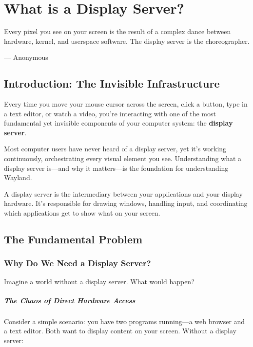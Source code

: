 \chapter{What is a Display Server?}
\label{ch:what-is-display-server}

\epigraph{Every pixel you see on your screen is the result of a complex dance between hardware, kernel, and userspace software. The display server is the choreographer.}{--- Anonymous}

\section{Introduction: The Invisible Infrastructure}

Every time you move your mouse cursor across the screen, click a button, type in a text editor, or watch a video, you're interacting with one of the most fundamental yet invisible components of your computer system: the \textbf{display server}.

Most computer users have never heard of a display server, yet it's working continuously, orchestrating every visual element you see. Understanding what a display server is—and why it matters—is the foundation for understanding Wayland.

\begin{importantbox}
A display server is the intermediary between your applications and your display hardware. It's responsible for drawing windows, handling input, and coordinating which applications get to show what on your screen.
\end{importantbox}

\section{The Fundamental Problem}

\subsection{Why Do We Need a Display Server?}

Imagine a world without a display server. What would happen?

\paragraph{The Chaos of Direct Hardware Access}

Consider a simple scenario: you have two programs running—a web browser and a text editor. Both want to display content on your screen. Without a display server:

